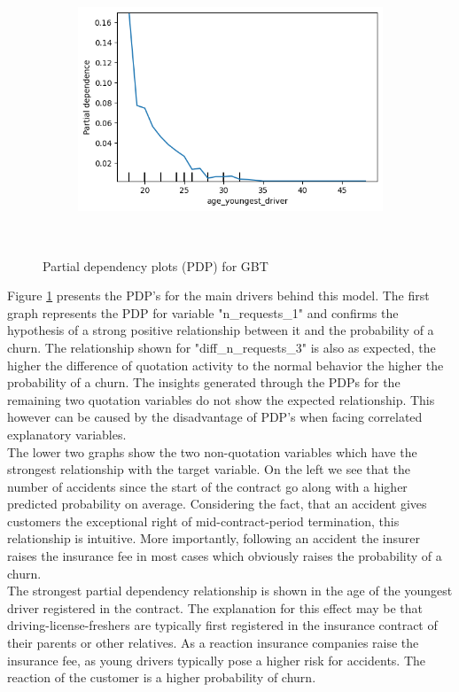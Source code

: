 \documentclass[12pt,titlepage]{article}
\begin{document}
\begin{figure}[h!]
\begin{subfigure}{.55\textwidth}
    \end{subfigure}%
    \begin{subfigure}{.55\textwidth}
        \centering
        \includegraphics[width=1\linewidth]{pdp_age_youngest_driver.png}
    \end{subfigure} \\
\caption{Partial dependency plots (PDP) for GBT}
\label{fig:pdp}
\end{figure}

Figure \ref{fig:pdp} presents the PDP's for the main drivers behind this model. The first graph represents the PDP for variable "n\_requests\_1" and confirms the hypothesis of a strong positive relationship between it and the probability of a churn. The relationship shown for "diff\_n\_requests\_3" is also as expected, the higher the difference of quotation activity to the normal behavior the higher the probability of a churn. The insights generated through the PDPs for the remaining two quotation variables do not show the expected relationship. This however can be caused by the disadvantage of PDP's when facing correlated explanatory variables. \\
The lower two graphs show the two non-quotation variables which have the strongest relationship with the target variable. On the left we see that the number of accidents since the start of the contract go along with a higher predicted probability on average. Considering the fact, that an accident gives customers the exceptional right of mid-contract-period termination, this relationship is intuitive. More importantly, following an accident the insurer raises the insurance fee in most cases which obviously raises the probability of a churn. \\
The strongest partial dependency relationship is shown in the age of the youngest driver registered in the contract. The explanation for this effect may be that driving-license-freshers are typically first registered in the insurance contract of their parents or other relatives. As a reaction insurance companies raise the insurance fee, as young drivers typically pose a higher risk for accidents. The reaction of the customer is a higher probability of churn. \\
\end{document}
